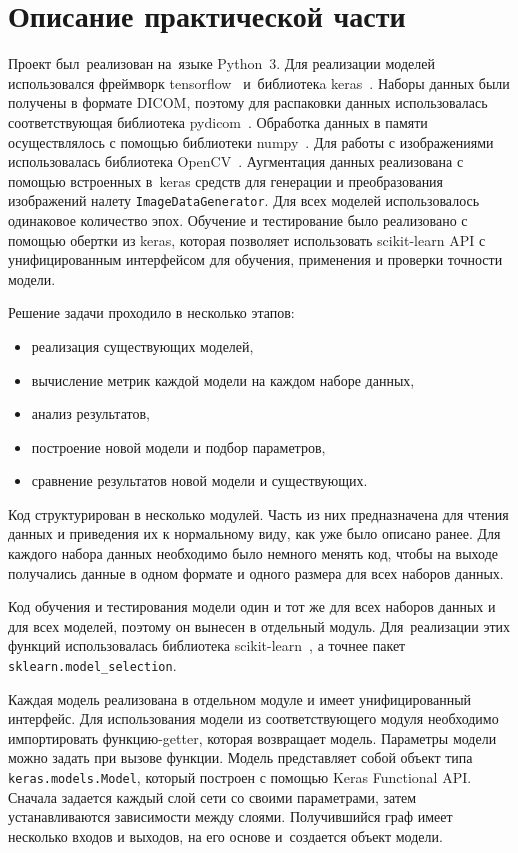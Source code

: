 \section{Описание практической части}

Проект был~реализован на~языке Python~3. Для реализации моделей использовался фреймворк tensorflow~\cite{tensorflow} и~библиотекa keras~\cite{keras}. Наборы данных были получены в формате DICOM, поэтому для распаковки данных использовалась соответствующая библиотека pydicom~\cite{pydicom}. Обработка данных в памяти осуществлялось с помощью библиотеки numpy~\cite{numpy}. Для работы с изображениями использовалась библиотека OpenCV~\cite{opencv}. Аугментация данных реализована с помощью встроенных в~keras средств для генерации и преобразования изображений налету \texttt{ImageDataGenerator}. Для всех моделей использовалось одинаковое количество эпох. Обучение и тестирование было реализовано с помощью обертки из keras, которая позволяет использовать scikit-learn API с унифицированным интерфейсом для обучения, применения и проверки точности модели.

Решение задачи проходило в несколько этапов:

\begin{itemize}
  \item реализация существующих моделей,
  \item вычисление метрик каждой модели на каждом наборе данных,
  \item анализ результатов,
  \item построение новой модели и подбор параметров,
  \item сравнение результатов новой модели и существующих.
\end{itemize}

Код структурирован в несколько модулей. Часть из них предназначена для чтения данных и приведения их к нормальному виду, как уже было описано ранее. Для каждого набора данных необходимо было немного менять код, чтобы на выходе получались данные в одном формате и одного размера для всех наборов данных.

Код обучения и тестирования модели один и тот же для всех наборов данных и для всех моделей, поэтому он вынесен в отдельный модуль. Для~реализации этих функций использовалась библиотека scikit-learn~\cite{sklearn}, а точнее пакет \texttt{sklearn.model\_selection}.

Каждая модель реализована в отдельном модуле и имеет унифицированный интерфейс. Для использования модели из соответствующего модуля необходимо импортировать функцию-getter, которая возвращает модель. Параметры модели можно задать при вызове функции. Модель представляет собой объект типа \texttt{keras.models.Model}, который построен с помощью Keras Functional API. Сначала задается каждый слой сети со своими параметрами, затем устанавливаются зависимости между слоями. Получившийся граф имеет несколько входов и выходов, на его основе и~создается объект модели. 

